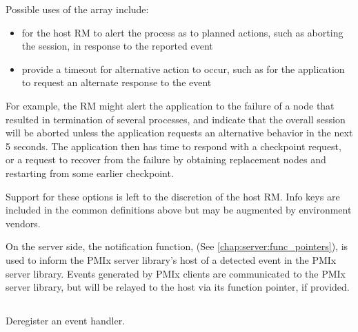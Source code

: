 \adviceuserstart
Possible uses of the  array include:

\begin{itemize}
%
\item for the host \ac{RM} to alert the process as to planned actions, such as aborting the session, in response to the reported event
%
\item provide a timeout for alternative action to occur, such as for the application to request an alternate response to the event
%
\end{itemize}

For example, the \ac{RM} might alert the application to the failure of a node that resulted in termination of several processes, and indicate that the overall session will be aborted unless the application requests an alternative behavior in the next 5 seconds. The application then has time to respond with a checkpoint request, or a request to recover from the failure by obtaining replacement nodes and restarting from some earlier checkpoint.

Support for these options is left to the discretion of the host \ac{RM}. Info keys are included in the common definitions above but may be augmented by environment vendors.
\adviceuserend

\advicermstart
On the server side, the notification function,  (See \ref{chap:server:func_pointers}), is used to inform the \ac{PMIx} server library's host of a detected event in the \ac{PMIx} server library. Events generated by \ac{PMIx} clients are communicated to the \ac{PMIx} server library, but will be relayed to the host via its  function pointer, if provided.
\advicermend


\subsection{}

\summary

Deregister an event handler.

\format


